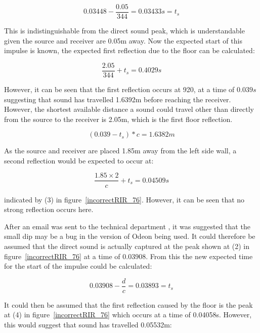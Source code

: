 \documentclass[../../main.tex]{subfiles}
\begin{document}
			\begin{equation}
			 0.03448 - \frac{0.05}{344} = 0.03433s = t_s
			\end{equation}

			This is indistinguishable from the direct sound peak, which is understandable given the source and receiver are 0.05m away. Now the expected start of this impulse is known, the expected first reflection due to the floor can be calculated:

			\begin{equation}
			\frac{2.05}{344} + t_s = 0.4029s
			\end{equation}

			However, it can be seen that the first reflection occurs at 920, at a time of $0.039s$ suggesting that sound has travelled 1.6392m before reaching the receiver. However, the shortest available distance a sound could travel other than directly from the source to the receiver is 2.05m, which is the first floor reflection.

			\begin{equation}
			(0.039 - t_s)*c = 1.6382m
			\end{equation}

			As the source and receiver are placed 1.85m away from the left side wall, a second reflection would be expected to occur at:

			\begin{equation}
			\frac{1.85\times{2}}{c} + t_s = 0.04509s
			\end{equation}

			indicated by (3) in figure~\ref{incorrectRIR_76}. However, it can be seen that no strong reflection occurs here.

			After an email was sent to the technical department \cite{odeonEmail}, it was suggested that the small dip may be a bug in the version of Odeon being used. It could therefore be assumed that the direct sound is actually captured at the peak shown at (2) in figure~\ref{incorrectRIR_76} at a time of $0.03908$. From this the new expected time for the start of the impulse could be calculated:

			\begin{equation}
			0.03908 - \frac{d}{c} = 0.03893 = t_s
			\end{equation}

			It could then be assumed that the first reflection caused by the floor is the peak at (4) in figure~\ref{incorrectRIR_76} which occurs at a time of 0.04058s. However, this would suggest that sound has travelled 0.05532m:
\end{document}
